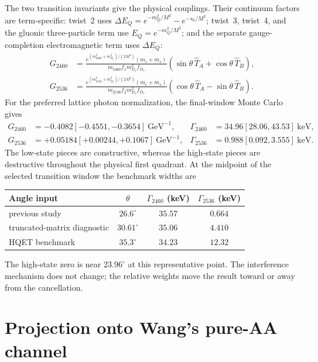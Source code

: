 \documentclass[11pt]{article}
\newcommand{\GeV}{\mathrm{GeV}}
\newcommand{\keV}{\mathrm{keV}}
\begin{document}
The two transition invariants give the physical couplings.  Their
continuum factors are term-specific: twist~2 uses
$\Delta E_Q=e^{-m_Q^2/M^2}-e^{-s_0/M^2}$; twist~3, twist~4, and the
gluonic three-particle term use $E_Q=e^{-m_Q^2/M^2}$; and the separate
gauge-completion electromagnetic term uses $\Delta E_Q$:
\begin{align}
G_{2460}&=
\frac{e^{(m_{2460}^2+m_{D_s}^2)/(2M^2)}(m_c+m_s)}
{m_{2460}f_1m_{D_s}^2f_{D_s}}
\left(\sin\theta\,\widehat T_A+\cos\theta\,\widehat T_B\right),\\
G_{2536}&=
\frac{e^{(m_{2536}^2+m_{D_s}^2)/(2M^2)}(m_c+m_s)}
{m_{2536}f_2m_{D_s}^2f_{D_s}}
\left(\cos\theta\,\widehat T_A-\sin\theta\,\widehat T_B\right).
\end{align}
For the preferred lattice photon normalization, the final-window Monte Carlo
gives
\begin{align}
G_{2460}&=-0.4082[-0.4551,-0.3654]~\GeV^{-1},&
\Gamma_{2460}&=34.96[28.06,43.53]~\keV,\\
G_{2536}&=+0.05184[+0.00244,+0.1067]~\GeV^{-1},&
\Gamma_{2536}&=0.988[0.092,3.555]~\keV.
\end{align}
The low-state pieces are constructive, whereas the high-state pieces are
destructive throughout the physical first quadrant.  At the midpoint of the
selected transition window the benchmark widths are
\begin{center}
\begin{tabular}{lccc}
\toprule
Angle input & $\theta$ & $\Gamma_{2460}$ (keV) & $\Gamma_{2536}$ (keV)\\
\midrule
previous study & $26.6^\circ$ & $35.57$ & $0.664$\\
truncated-matrix diagnostic & $30.61^\circ$ & $35.06$ & $4.410$\\
HQET benchmark & $35.3^\circ$ & $34.23$ & $12.32$\\
\bottomrule
\end{tabular}
\end{center}
The high-state zero is near $23.96^\circ$ at this representative point.  The
interference mechanism does not change; the relative weights move the result
toward or away from the cancellation.

\section{Projection onto Wang's pure-AA channel}
\end{document}
